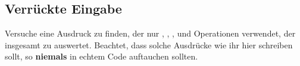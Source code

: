 \subsection{Verrückte Eingabe }

Versuche eine Ausdruck zu finden, der nur , ,
,  und Operationen verwendet, der
insgesamt zu  auswertet. Beachtet, dass solche Ausdrücke
wie ihr hier schreiben sollt, so \textbf{niemals} in echtem Code auftauchen
sollten.
